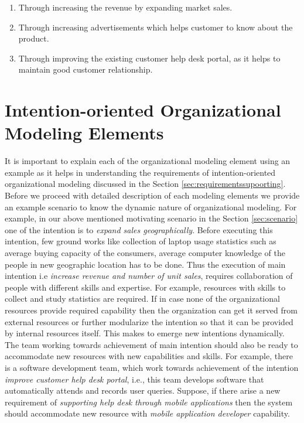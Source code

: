 \begin{enumerate}
 	\item Through increasing the revenue by expanding market sales. 
 	\item Through increasing advertisements which helps customer to know about the product.
 	\item Through improving the existing customer help desk portal, as it helps to maintain good customer relationship.
 \end{enumerate}
 
\section{Intention-oriented Organizational Modeling Elements}
\label{sec:entities}
It is important to explain each of the organizational modeling element using an example as it helps in understanding the requirements of intention-oriented organizational modeling discussed in the Section \ref{sec:requirementssupoorting}. Before we proceed with detailed description of each modeling elements we provide an example scenario to know the dynamic nature of organizational modeling. For example, in our above mentioned motivating scenario in the Section \ref{sec:scenario} one of the intention is to \textit{expand sales geographically}. Before executing this intention, few ground works like collection of laptop usage statistics such as average buying capacity of the consumers, average computer knowledge of the people in new geographic location has to be done. Thus the execution of main intention i.e \textit{increase revenue and number of unit sales}, requires collaboration of people with different skills and expertise. For example, resources with skills to collect and study statistics are required. If in case none of the organizational resources provide required capability then the organization can get it served from external resources or further modularize the intention so that it can be provided by internal resources itself. This makes to emerge new intentions dynamically. The team working towards achievement of main intention should also be ready to accommodate new resources with new capabilities and skills. For example, there is a software development team, which work towards achievement of the intention \textit{improve customer help desk portal}, i.e., this team develops software that automatically attends and records user queries. Suppose, if there arise a new requirement of \textit{supporting help desk through mobile applications} then the system should accommodate new resource with \textit{mobile application developer} capability. 

